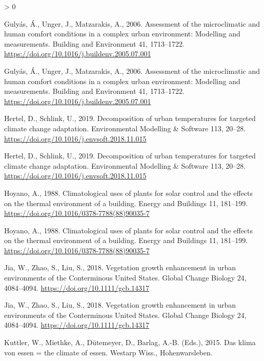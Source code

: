 \documentclass[
]{article}
\newlength{\cslhangindent}
\newenvironment{CSLReferences}[2] %
 {%
  \setlength{\parindent}{0pt}
  \ifodd #1 \everypar{\setlength{\hangindent}{\cslhangindent}}\ignorespaces\fi
  \ifnum #2 > 0
  \setlength{\parskip}{#2\baselineskip}
  \fi
 }%
 {}
\begin{document}
\begin{CSLReferences}{1}{0}
\leavevmode\hypertarget{ref-gulyas2006}{}%
Gulyás, Á., Unger, J., Matzarakis, A., 2006. Assessment of the microclimatic and human comfort conditions in a complex urban environment: {Modelling} and measurements. Building and Environment 41, 1713--1722. \url{https://doi.org/10.1016/j.buildenv.2005.07.001}

\leavevmode\hypertarget{ref-gulyas2006}{}%
Gulyás, Á., Unger, J., Matzarakis, A., 2006. Assessment of the microclimatic and human comfort conditions in a complex urban environment: {Modelling} and measurements. Building and Environment 41, 1713--1722. \url{https://doi.org/10.1016/j.buildenv.2005.07.001}

\leavevmode\hypertarget{ref-hertel2019}{}%
Hertel, D., Schlink, U., 2019. Decomposition of urban temperatures for targeted climate change adaptation. Environmental Modelling \& Software 113, 20--28. \url{https://doi.org/10.1016/j.envsoft.2018.11.015}

\leavevmode\hypertarget{ref-hertel2019}{}%
Hertel, D., Schlink, U., 2019. Decomposition of urban temperatures for targeted climate change adaptation. Environmental Modelling \& Software 113, 20--28. \url{https://doi.org/10.1016/j.envsoft.2018.11.015}

\leavevmode\hypertarget{ref-hoyano1988}{}%
Hoyano, A., 1988. Climatological uses of plants for solar control and the effects on the thermal environment of a building. Energy and Buildings 11, 181--199. \url{https://doi.org/10.1016/0378-7788(88)90035-7}

\leavevmode\hypertarget{ref-hoyano1988}{}%
Hoyano, A., 1988. Climatological uses of plants for solar control and the effects on the thermal environment of a building. Energy and Buildings 11, 181--199. \url{https://doi.org/10.1016/0378-7788(88)90035-7}

\leavevmode\hypertarget{ref-jia2018}{}%
Jia, W., Zhao, S., Liu, S., 2018. Vegetation growth enhancement in urban environments of the {Conterminous United States}. Global Change Biology 24, 4084--4094. \url{https://doi.org/10.1111/gcb.14317}

\leavevmode\hypertarget{ref-jia2018}{}%
Jia, W., Zhao, S., Liu, S., 2018. Vegetation growth enhancement in urban environments of the {Conterminous United States}. Global Change Biology 24, 4084--4094. \url{https://doi.org/10.1111/gcb.14317}

\leavevmode\hypertarget{ref-kuttler2015}{}%
Kuttler, W., Miethke, A., Dütemeyer, D., Barlag, A.-B. (Eds.), 2015. Das klima von essen = the climate of essen. {Westarp Wiss.}, {Hohenwarsleben}.


\end{CSLReferences}
\end{document}
